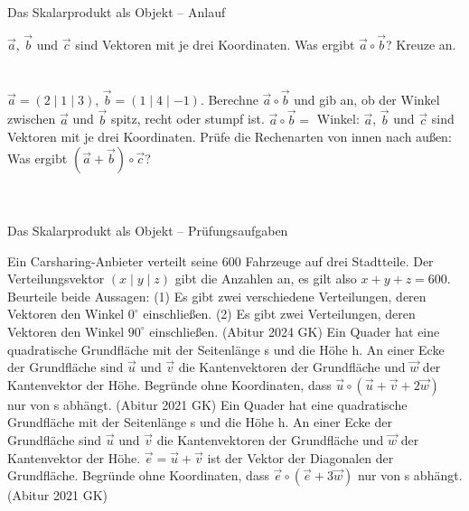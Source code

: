 \setcounter{aufgabe}{72}

\begin{aufgabe}{Das Skalarprodukt als Objekt – Anlauf}
\begin{teile}
\teil $\vec a$, $\vec b$ und $\vec c$ sind Vektoren mit je drei Koordinaten. Was ergibt $\vec a \circ \vec b$? Kreuze an. \\  \\  \\ 
\teil $\vec a = (2 \mid 1 \mid 3)$, $\vec b = (1 \mid 4 \mid -1)$. Berechne $\vec a \circ \vec b$ und gib an, ob der Winkel zwischen $\vec a$ und $\vec b$ spitz, recht oder stumpf ist. $\vec a \circ \vec b =$ \leerfeld \quad Winkel: \leerfeld
\teil $\vec a$, $\vec b$ und $\vec c$ sind Vektoren mit je drei Koordinaten. Prüfe die Rechenarten von innen nach außen: Was ergibt $(\vec a + \vec b) \circ \vec c$? \\  \\  \\ 
\end{teile}
\end{aufgabe}

\begin{aufgabe}{Das Skalarprodukt als Objekt – Prüfungsaufgaben}
\begin{teile}
\teil Ein Carsharing-Anbieter verteilt seine $600$ Fahrzeuge auf drei Stadtteile. Der Verteilungsvektor $(x \mid y \mid z)$ gibt die Anzahlen an, es gilt also $x + y + z = 600$. Beurteile beide Aussagen: (1) Es gibt zwei verschiedene Verteilungen, deren Vektoren den Winkel $0^\circ$ einschließen. (2) Es gibt zwei Verteilungen, deren Vektoren den Winkel $90^\circ$ einschließen. \hfill (Abitur 2024 GK)
\teil Ein Quader hat eine quadratische Grundfläche mit der Seitenlänge s und die Höhe h. An einer Ecke der Grundfläche sind $\vec u$ und $\vec v$ die Kantenvektoren der Grundfläche und $\vec w$ der Kantenvektor der Höhe. Begründe ohne Koordinaten, dass $\vec u \circ (\vec u + \vec v + 2\vec w)$ nur von s abhängt. \hfill (Abitur 2021 GK)
\teil Ein Quader hat eine quadratische Grundfläche mit der Seitenlänge s und die Höhe h. An einer Ecke der Grundfläche sind $\vec u$ und $\vec v$ die Kantenvektoren der Grundfläche und $\vec w$ der Kantenvektor der Höhe. $\vec e = \vec u + \vec v$ ist der Vektor der Diagonalen der Grundfläche. Begründe ohne Koordinaten, dass $\vec e \circ (\vec e + 3\vec w)$ nur von s abhängt. \hfill (Abitur 2021 GK)
\end{teile}
\end{aufgabe}

